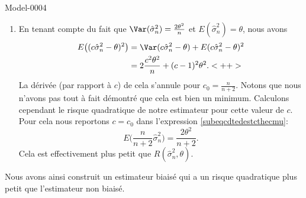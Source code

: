 \begin{corrige}{Model-0004}
\begin{enumerate}
        \item
            En tenant compte du fait que \( \Var(\hat\sigma_n^2)=\frac{ 2\theta^2 }{ n }\) et \( E(\hat\sigma_n^2)=\theta\), nous avons
            \begin{subequations}
                \begin{align}
                    E\big( (c\hat\sigma_n^2-\theta)^2 \big)&=\Var(c\hat\sigma_n^2-\theta)+E(c\hat\sigma_n^2-\theta)^2\\
                    &=2\frac{ c^2\theta^2 }{ n }+(c-1)^2\theta^2.   \label{subeqcdtedestcthecmu}<++>
                \end{align}
            \end{subequations}
            La dérivée (par rapport à \( c\)) de cela s'annule pour \( c_0=\frac{ n }{ n+2 }\). Notons que nous n'avons pas tout à fait démontré que cela est bien un minimum. Calculons cependant le risque quadratique de notre estimateur pour cette valeur de \( c\). Pour cela nous reportons \( c=c_0\) dans l'expression \eqref{subeqcdtedestcthecmu}:
            \begin{equation}
                E\big( \frac{ n }{ n+2 }\hat\sigma_n^2 \big)=\frac{ 2\theta^2 }{ n+2 }.
            \end{equation}
            Cela est effectivement plus petit que \( R(\hat\sigma_n^2,\theta)\).
    \end{enumerate}
    Nous avons ainsi construit un estimateur biaisé qui a un risque quadratique plus petit que l'estimateur non biaisé.

\end{corrige}
